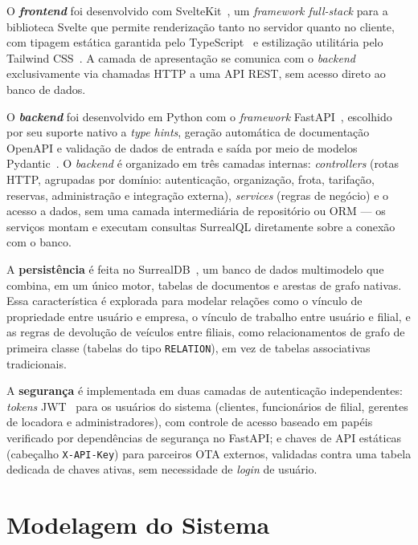 \documentclass[conference,a4paper]{IEEEtran}
\newcommand{\code}[1]{\texttt{#1}}
\begin{document}
O \textbf{\textit{frontend}} foi desenvolvido com SvelteKit~\cite{svelte}, um \textit{framework full-stack} para a biblioteca Svelte que permite renderização tanto no servidor quanto no cliente, com tipagem estática garantida pelo TypeScript~\cite{typescript} e estilização utilitária pelo Tailwind CSS~\cite{tailwind}. A camada de apresentação se comunica com o \textit{backend} exclusivamente via chamadas HTTP a uma API REST, sem acesso direto ao banco de dados.

O \textbf{\textit{backend}} foi desenvolvido em Python com o \textit{framework} FastAPI~\cite{fastapi, python}, escolhido por seu suporte nativo a \textit{type hints}, geração automática de documentação OpenAPI e validação de dados de entrada e saída por meio de modelos Pydantic~\cite{pydantic}. O \textit{backend} é organizado em três camadas internas: \textit{controllers} (rotas HTTP, agrupadas por domínio: autenticação, organização, frota, tarifação, reservas, administração e integração externa), \textit{services} (regras de negócio) e o acesso a dados, sem uma camada intermediária de repositório ou ORM --- os serviços montam e executam consultas SurrealQL diretamente sobre a conexão com o banco.

A \textbf{persistência} é feita no SurrealDB~\cite{surrealdb}, um banco de dados multimodelo que combina, em um único motor, tabelas de documentos e arestas de grafo nativas. Essa característica é explorada para modelar relações como o vínculo de propriedade entre usuário e empresa, o vínculo de trabalho entre usuário e filial, e as regras de devolução de veículos entre filiais, como relacionamentos de grafo de primeira classe (tabelas do tipo \code{RELATION}), em vez de tabelas associativas tradicionais.

A \textbf{segurança} é implementada em duas camadas de autenticação independentes: \textit{tokens} JWT~\cite{jones2015} para os usuários do sistema (clientes, funcionários de filial, gerentes de locadora e administradores), com controle de acesso baseado em papéis verificado por dependências de segurança no FastAPI; e chaves de API estáticas (cabeçalho \code{X-API-Key}) para parceiros OTA externos, validadas contra uma tabela dedicada de chaves ativas, sem necessidade de \textit{login} de usuário.

\section{Modelagem do Sistema}
\end{document}
